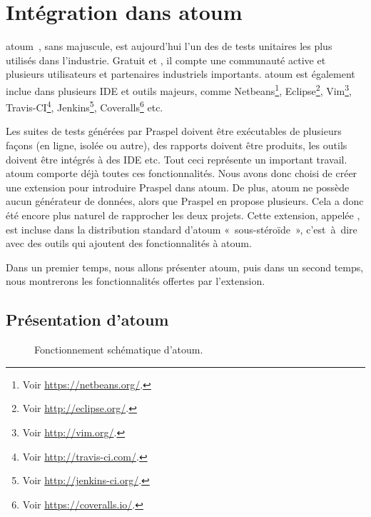 \section{Intégration dans atoum}
\label{section:tools:atoum}

atoum~, sans majuscule, est aujourd'hui l'un des
 de tests unitaires les plus utilisés dans l'industrie. Gratuit et
, il compte une communauté active et plusieurs
utilisateurs et partenaires industriels importants. atoum est également inclue
dans plusieurs IDE et outils majeurs, comme Netbeans\footnote{Voir
\url{https://netbeans.org/}.}, Eclipse\footnote{Voir
\url{http://eclipse.org/}.}, Vim\footnote{Voir \url{http://vim.org/}.},
Travis-CI\footnote{Voir \url{http://travis-ci.com/}.}, Jenkins\footnote{Voir
\url{http://jenkins-ci.org/}.}, Coveralls\footnote{Voir
\url{https://coveralls.io/}.} etc.

Les suites de tests générées par Praspel doivent être exécutables de plusieurs
façons (en ligne, isolée ou autre), des rapports doivent être produits, les
outils doivent être intégrés à des IDE etc. Tout ceci représente un important
travail. atoum comporte déjà toutes ces fonctionnalités. Nous avons donc choisi
de créer une extension pour introduire Praspel dans atoum. De plus, atoum ne
possède aucun générateur de données, alors que Praspel en propose plusieurs.
Cela a donc été encore plus naturel de rapprocher les deux projets. Cette
extension, appelée , est incluse dans la
distribution standard d'atoum «~sous-stéroïde~», c'est~à~dire avec des outils
qui ajoutent des fonctionnalités à atoum.

Dans un premier temps, nous allons présenter atoum, puis dans un second temps,
nous montrerons les fonctionnalités offertes par l'extension.

\subsection{Présentation d'atoum}

\begin{figure}


\caption{\label{figure:tools:atoum} Fonctionnement schématique d'atoum.}

\end{figure}

